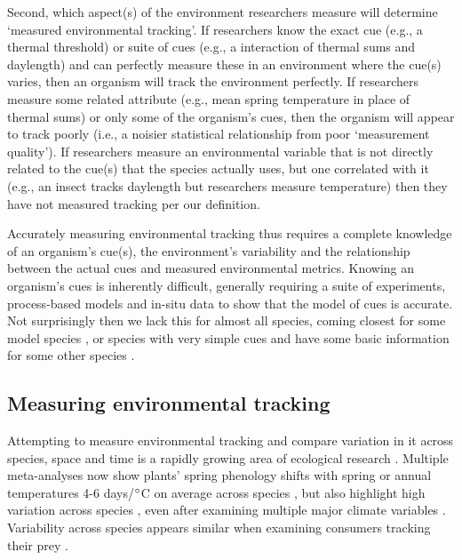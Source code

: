 \documentclass[11pt,letterpaper]{article}
\newcommand{\R}[1]{\label{#1}\linelabel{#1}}
\begin{document}
Second, which aspect(s) of the environment researchers measure will determine `measured environmental tracking'. If researchers know the exact cue (e.g., a thermal threshold) or suite of cues (e.g., a interaction of thermal sums and daylength) and can perfectly measure these in an environment where the cue(s) varies, then an organism will track the environment perfectly. If researchers measure some related attribute (e.g., mean spring temperature in place of thermal sums) or only some of the organism's cues, then the organism will appear to track poorly (i.e., a noisier statistical relationship from poor `measurement quality').  If researchers measure an environmental variable that is not directly related to the cue(s) that the species actually uses, but one correlated with it (e.g., an insect tracks daylength but researchers measure temperature) then they have not measured tracking per our definition.

Accurately measuring environmental tracking thus requires a complete knowledge of an organism's cue(s), the environment's variability and the relationship between the actual cues and measured environmental metrics. Knowing an organism's cues is inherently difficult, generally requiring a suite of experiments, process-based models and in-situ data to show that the model of cues is accurate. Not surprisingly then we lack this for almost all species, coming closest for some model species \citep[e.g., \emph{Arabidopsis thaliana},][]{Kingsolver2007,Wilczek:2009oa}, or species with very simple cues \citep[e.g., coral \emph{Acropora millepora},][]{levy2007} and have some basic information for some other species \citep[e.g., the Great Tit, \emph{Parus major},][]{charm2008}. \R{define1end}

\subsection{Measuring environmental tracking}
\R{newopenmeasure} Attempting to measure environmental tracking and compare variation in it across species, space and time is a rapidly growing area of ecological research \citep[e.g.,][]{Cook:2012pnas,fu2015,thackeray2016,cohen2018}. Multiple meta-analyses now show plants' spring phenology shifts with spring or annual temperatures 4-6 days/$\degree$C on average across species \citep{Richardson:2006qh,Wolkovich:2012n,thackeray2016}, but also highlight high variation across species  \citep{Cook:2012pnas}, even after examining multiple major climate variables \citep{thackeray2016}. Variability across species appears similar when examining consumers tracking their prey \citep[across diverse species tracking over time is 6.1 days/decade but ranges from zero to 15 days/decade, see][]{kharouba2018}. 
\end{document}
